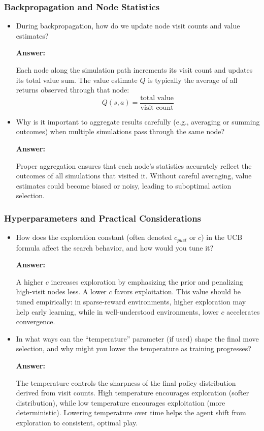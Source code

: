 \subsubsection{Backpropagation and Node Statistics}
\begin{itemize}
    \item During backpropagation, how do we update node visit counts and value estimates?  

    \textbf{Answer:}

    Each node along the simulation path increments its visit count and updates its total value sum. The value estimate $Q$ is typically the average of all returns observed through that node: 
    \[
    Q(s, a) = \frac{\text{total value}}{\text{visit count}}
    \]

    \item Why is it important to aggregate results carefully (e.g., averaging or summing outcomes) when multiple simulations pass through the same node?

    \textbf{Answer:}

    Proper aggregation ensures that each node's statistics accurately reflect the outcomes of all simulations that visited it. Without careful averaging, value estimates could become biased or noisy, leading to suboptimal action selection.

\end{itemize}


\subsubsection{Hyperparameters and Practical Considerations}
\begin{itemize}
    \item How does the exploration constant (often denoted \( c_{puct} \) or \( c \)) in the UCB formula affect the search behavior, and how would you tune it?  

    \textbf{Answer:}

    A higher \( c \) increases exploration by emphasizing the prior and penalizing high-visit nodes less. A lower \( c \) favors exploitation. This value should be tuned empirically: in sparse-reward environments, higher exploration may help early learning, while in well-understood environments, lower \( c \) accelerates convergence.

    \item In what ways can the “temperature” parameter (if used) shape the final move selection, and why might you lower the temperature as training progresses?

    \textbf{Answer:}
    
    The temperature controls the sharpness of the final policy distribution derived from visit counts. High temperature encourages exploration (softer distribution), while low temperature encourages exploitation (more deterministic). Lowering temperature over time helps the agent shift from exploration to consistent, optimal play.

\end{itemize}



